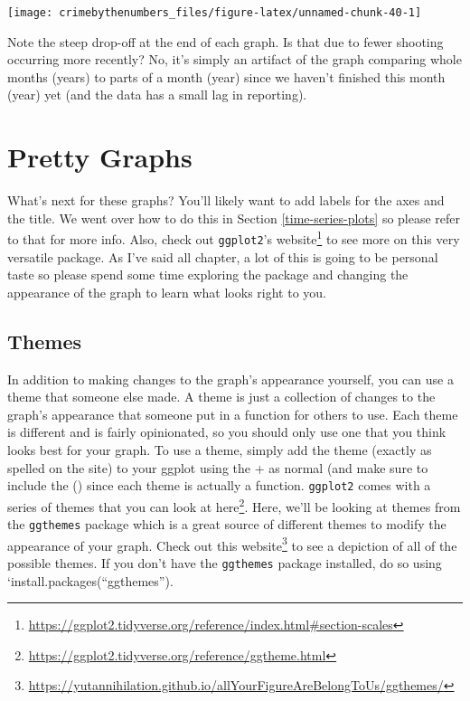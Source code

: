\documentclass[
]{krantz}
\renewcommand{\href}[2]{#2\footnote{\url{#1}}}
\begin{document}
\begin{center}\texttt{[image: crimebythenumbers\_files/figure-latex/unnamed-chunk-40-1]} \end{center}

Note the steep drop-off at the end of each graph. Is that due to fewer shooting occurring more recently? No, it's simply an artifact of the graph comparing whole months (years) to parts of a month (year) since we haven't finished this month (year) yet (and the data has a small lag in reporting).

\hypertarget{pretty-graphs}{%
\section{Pretty Graphs}\label{pretty-graphs}}

What's next for these graphs? You'll likely want to add labels for the axes and the title. We went over how to do this in Section \ref{time-series-plots} so please refer to that for more info. Also, check out \texttt{ggplot2}'s \href{https://ggplot2.tidyverse.org/reference/index.html\#section-scales}{website} to see more on this very versatile package. As I've said all chapter, a lot of this is going to be personal taste so please spend some time exploring the package and changing the appearance of the graph to learn what looks right to you.

\hypertarget{themes}{%
\subsection{Themes}\label{themes}}

In addition to making changes to the graph's appearance yourself, you can use a theme that someone else made. A theme is just a collection of changes to the graph's appearance that someone put in a function for others to use. Each theme is different and is fairly opinionated, so you should only use one that you think looks best for your graph. To use a theme, simply add the theme (exactly as spelled on the site) to your ggplot using the + as normal (and make sure to include the () since each theme is actually a function. \texttt{ggplot2} comes with a series of themes that you can look at \href{https://ggplot2.tidyverse.org/reference/ggtheme.html}{here}. Here, we'll be looking at themes from the \texttt{ggthemes} package which is a great source of different themes to modify the appearance of your graph. Check out this \href{https://yutannihilation.github.io/allYourFigureAreBelongToUs/ggthemes/}{website} to see a depiction of all of the possible themes. If you don't have the \texttt{ggthemes} package installed, do so using `install.packages(``ggthemes'').
\end{document}
